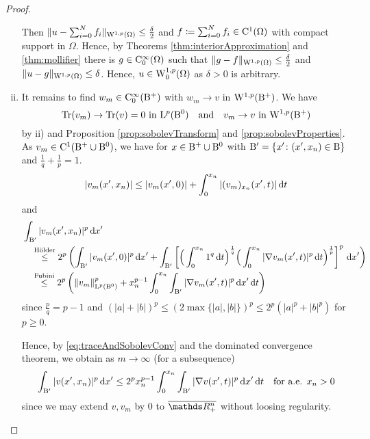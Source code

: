 \begin{proof}
\begin{enumerate}[i)]
    Then $\| u - \sum_{i = 0}^N f_i \|_{\mathrm{W}^{1,p}(\Omega)} \leq \frac{\delta}{2}$ and $f \coloneqq \sum_{i = 0}^N f_i \in \mathrm{C}^1(\Omega)$ with compact support in $\Omega$.
    Hence, by Theorems \ref{thm:interiorApproximation} and \ref{thm:mollifier} there is $g \in \mathrm{C}_0^\infty(\Omega)$ such that $\|g - f\|_{\mathrm{W}^{1,p}(\Omega)} \leq \frac{\delta}{2}$ and $\|u - g\|_{\mathrm{W}^{1,p}(\Omega)} \leq \delta$.
    Hence, $u \in \mathrm{W}_0^{1,p}(\Omega)$ as $\delta > 0$ is arbitrary.

  \item It remains to find $w_m \in \mathrm{C}_0^\infty(\mathrm{B}^+)$ with $w_m \to v$ in $\mathrm{W}^{1,p}(\mathrm{B}^+)$.
    We have
    \begin{equation}
      \label{eq:traceAndSobolevConv}
      \operatorname{Tr}(v_m) \to \operatorname{Tr}(v) = 0 \text{ in } \mathrm{L}^p(\mathrm{B}^0) 
      \quad\text{and}\quad
      v_m \to v \text{ in } \mathrm{W}^{1,p}(\mathrm{B}^+)
    \end{equation}
    by ii) and Proposition \ref{prop:sobolevTransform} and \ref{prop:sobolevProperties}.
    As $v_m \in \mathrm{C}^1(\mathrm{B}^+ \cup \mathrm{B}^0)$, we have for $x \in \mathrm{B}^+ \cup \mathrm{B}^0$ with $\mathrm{B}' = \{x' \colon (x', x_n) \in \mathrm{B}\}$ and $\frac{1}{q} + \frac{1}{p} = 1$.
    $$
    |v_m(x', x_n)|
    \leq |v_m(x',0)| + \int_0^{x_n} |(v_m)_{x_n} (x', t)| \, {\operatorname{d}\!{t}}
    $$
    and
    \begin{align*}
      &\int_{\mathrm{B}'} |v_m(x', x_n)|^p \, {\operatorname{d}\!{x}}' \\
      &\quad\overset{\text{Hölder}}{\leq} 2^p \left( \int_{\mathrm{B}'} |v_m(x',0)|^p \, {\operatorname{d}\!{x}}' +  \int_{\mathrm{B}'}\left[  \Big(\int_0^{x_n} 1^q \, {\operatorname{d}\!{t}}\Big)^{\frac{1}{q}} \Big( \int_0^{x_n} |\nabla v_m(x',t)|^p \, {\operatorname{d}\!{t}} \Big)^{\frac{1}{p}}\right]^p  \, {\operatorname{d}\!{x}}'  \right) \\
      &\quad\overset{\text{Fubini}}{\leq} 2^p \left( \|v_m\|_{\mathrm{L}^p(\mathrm{B}^0)}^p + x_n^{p - 1} \int_0^{x_n} \int_{\mathrm{B}'} | \nabla v_m(x',t)|^p \, {\operatorname{d}\!{x}}' \, {\operatorname{d}\!{t}} \right)
    \end{align*}
      since $\frac{p}{q} = p - 1$ and $(|a| + |b|)^p \leq (2\max\{|a|,|b|\})^p \leq 2^p(|a|^p + |b|^p)$ for $p \geq 0$.

    Hence, by \eqref{eq:traceAndSobolevConv} and the dominated convergence theorem, we obtain as $m \to \infty$ (for a subsequence)
    \begin{equation}
      \label{eq:vEstimateByGradient}
      \int_{\mathrm{B}'} |v(x',x_n)|^p \, {\operatorname{d}\!{x}}'
      \leq 2^p x_n^{p - 1} \int_0^{x_n} \int_{\mathrm{B}'} |\nabla v(x',t)|^p \, {\operatorname{d}\!{x}}' \, {\operatorname{d}\!{t}} \quad\text{for a.e. } x_n > 0
    \end{equation}
    since we may extend $v, v_m$ by $0$ to $\overline{\R^n_+}$ without loosing regularity.


\end{enumerate}
\end{proof}
